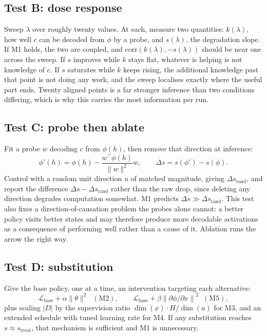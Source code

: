 \documentclass[9pt]{extarticle}
\begin{document}
\subsection{Test B: dose response}

Sweep $\lambda$ over roughly twenty values. At each, measure two quantities: $k(\lambda)$, how well $c$ can be decoded from $\phi$ by a probe, and $s(\lambda)$, the degradation slope. If M1 holds, the two are coupled, and $\mathrm{corr}(k(\lambda), -s(\lambda))$ should be near one across the sweep. If $s$ improves while $k$ stays flat, whatever is helping is not knowledge of $c$. If $s$ saturates while $k$ keeps rising, the additional knowledge past that point is not doing any work, and the sweep localises exactly where the useful part ends. Twenty aligned points is a far stronger inference than two conditions differing, which is why this carries the most information per run.

\subsection{Test C: probe then ablate}

Fit a probe $w$ decoding $c$ from $\phi(h)$, then remove that direction at inference:
\[
\phi'(h) = \phi(h) - \frac{w^\top \phi(h)}{\|w\|^2} w, \qquad \Delta s = s(\phi') - s(\phi).
\]
Control with a random unit direction $u$ of matched magnitude, giving $\Delta s_{\text{rand}}$, and report the difference $\Delta s - \Delta s_{\text{rand}}$ rather than the raw drop, since deleting any direction degrades computation somewhat. M1 predicts $\Delta s \gg \Delta s_{\text{rand}}$. This test also fixes a direction-of-causation problem the probes alone cannot: a better policy visits better states and may therefore produce more decodable activations as a consequence of performing well rather than a cause of it. Ablation runs the arrow the right way.

\subsection{Test D: substitution}

Give the base policy, one at a time, an intervention targeting each alternative:
\[
\mathcal{L}_{\text{base}} + \alpha\|\theta\|^2 \;\;(\text{M2}), \qquad
\mathcal{L}_{\text{base}} + \beta\left\|\partial\phi/\partial x\right\|^2 \;\;(\text{M5}),
\]
plus scaling $|D|$ by the supervision ratio $\dim(x)\cdot H / \dim(a)$ for M3, and an extended schedule with tuned learning rate for M4. If any substitution reaches $s \approx s_{\text{treat}}$, that mechanism is sufficient and M1 is unnecessary.
\end{document}
